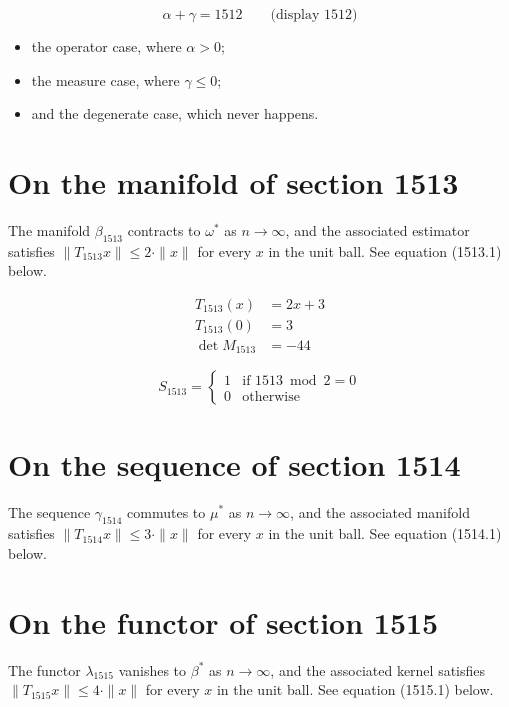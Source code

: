 \documentclass{article}
\begin{document}
$$
\alpha + \gamma = 1512 \qquad \text{(display 1512)}
$$

\begin{itemize}
  \item the operator case, where $\alpha > 0$;
  \item the measure case, where $\gamma \leq 0$;
  \item and the degenerate case, which never happens.
\end{itemize}

\section{On the manifold of section 1513}
The manifold $\beta_{1513}$ contracts to $\omega^{*}$ as $n \to \infty$,
and the associated estimator satisfies $\|T_{1513} x\| \leq 2 \cdot \|x\|$
for every $x$ in the unit ball. See equation (1513.1) below.

\begin{align}
T_{1513}(x) &= 2 x + 3 \\
T_{1513}(0) &= 3 \\
\det M_{1513} &= -44
\end{align}

\begin{equation}
S_{1513} = \begin{cases} 1 & \text{if } 1513 \bmod 2 = 0 \\ 0 & \text{otherwise} \end{cases}
\end{equation}

\section{On the sequence of section 1514}
The sequence $\gamma_{1514}$ commutes to $\mu^{*}$ as $n \to \infty$,
and the associated manifold satisfies $\|T_{1514} x\| \leq 3 \cdot \|x\|$
for every $x$ in the unit ball. See equation (1514.1) below.

\section{On the functor of section 1515}
The functor $\lambda_{1515}$ vanishes to $\beta^{*}$ as $n \to \infty$,
and the associated kernel satisfies $\|T_{1515} x\| \leq 4 \cdot \|x\|$
for every $x$ in the unit ball. See equation (1515.1) below.
\end{document}
